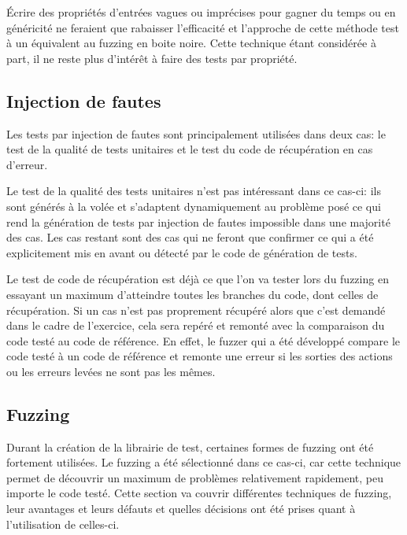 \documentclass[a4paper]{report}
\begin{document}
Écrire des propriétés d'entrées vagues ou imprécises pour gagner du temps ou en généricité ne feraient que rabaisser l'efficacité et l'approche de cette méthode test à un équivalent au fuzzing en boite noire.
Cette technique étant considérée à part, il ne reste plus d'intérêt à faire des tests par propriété. 

\subsection{Injection de fautes}

Les tests par injection de fautes sont principalement utilisées dans deux cas: le test de la qualité de tests unitaires et le test du code de récupération en cas d'erreur.

Le test de la qualité des tests unitaires n'est pas intéressant dans ce cas-ci: ils sont générés à la volée et s'adaptent dynamiquement au problème posé ce qui rend la génération de tests par injection de fautes impossible dans une majorité des cas.
Les cas restant sont des cas qui ne feront que confirmer ce qui a été explicitement mis en avant ou détecté par le code de génération de tests.

Le test de code de récupération est déjà ce que l'on va tester lors du fuzzing en essayant un maximum d'atteindre toutes les branches du code, dont celles de récupération.
Si un cas n'est pas proprement récupéré alors que c'est demandé dans le cadre de l'exercice, cela sera repéré et remonté avec la comparaison du code testé au code de référence.
En effet, le fuzzer qui a été développé compare le code testé à un code de référence et remonte une erreur si les sorties des actions ou les erreurs levées ne sont pas les mêmes.

\subsection{Fuzzing}

Durant la création de la librairie de test, certaines formes de fuzzing ont été fortement utilisées.
Le fuzzing a été sélectionné dans ce cas-ci, car cette technique permet de découvrir un maximum de problèmes relativement rapidement, peu importe le code testé.
Cette section va couvrir différentes techniques de fuzzing, leur avantages et leurs défauts et quelles décisions ont été prises quant à l'utilisation de celles-ci.
\end{document}
